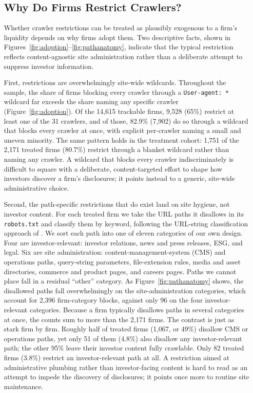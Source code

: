\documentclass[12pt]{article}
\begin{document}


\subsection{Why Do Firms Restrict Crawlers?}\label{sec:bg_why}
Whether crawler restrictions can be treated as plausibly exogenous to a firm's liquidity depends on why firms adopt them. Two descriptive facts, shown in Figures~\ref{fig:adoption}--\ref{fig:pathanatomy}, indicate that the typical restriction reflects content-agnostic site administration rather than a deliberate attempt to suppress investor information.

First, restrictions are overwhelmingly site-wide wildcards. Throughout the sample, the share of firms blocking every crawler through a \texttt{User-agent: *} wildcard far exceeds the share naming any specific crawler (Figure~\ref{fig:adoption}). Of the 14{,}615 trackable firms, 9{,}528 (65\%) restrict at least one of the 31 crawlers, and of those, 82.9\% (7{,}902) do so through a wildcard that blocks every crawler at once, with explicit per-crawler naming a small and uneven minority. The same pattern holds in the treatment cohort: 1{,}751 of the 2{,}171 treated firms (80.7\%) restrict through a blanket wildcard rather than naming any crawler. A wildcard that blocks every crawler indiscriminately is difficult to square with a deliberate, content-targeted effort to shape how investors discover a firm's disclosures; it points instead to a generic, site-wide administrative choice.

Second, the path-specific restrictions that do exist land on site hygiene, not investor content. For each treated firm we take the URL paths it disallows in its \texttt{robots.txt} and classify them by keyword, following the URL-string classification approach of \citet{BoullandBourveauBreuer2026}. We sort each path into one of eleven categories of our own design. Four are investor-relevant: investor relations, news and press releases, ESG, and legal. Six are site administration: content-management-system (CMS) and operations paths, query-string parameters, file-extension rules, media and asset directories, commerce and product pages, and careers pages. Paths we cannot place fall in a residual ``other'' category. As Figure~\ref{fig:pathanatomy} shows, the disallowed paths fall overwhelmingly on the site-administration categories, which account for 2{,}396 firm-category blocks, against only 96 on the four investor-relevant categories. Because a firm typically disallows paths in several categories at once, the counts sum to more than the 2{,}171 firms. The contrast is just as stark firm by firm. Roughly half of treated firms (1{,}067, or 49\%) disallow CMS or operations paths, yet only 51 of them (4.8\%) also disallow any investor-relevant path; the other 95\% leave their investor content fully crawlable. Only 82 treated firms (3.8\%) restrict an investor-relevant path at all. A restriction aimed at administrative plumbing rather than investor-facing content is hard to read as an attempt to impede the discovery of disclosures; it points once more to routine site maintenance.
\end{document}
